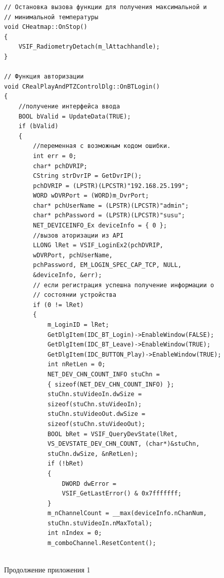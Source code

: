\documentclass[14pt, a4paper]{extreport}
\begin{document}
\begin{Verbatim}[fontseries=c, fontsize=\fontsize{10pt}{12pt}\selectfont]
// Остановка вызова функции для получения максимальной и 
// минимальной температуры
void CHeatmap::OnStop()
{
	VSIF_RadiometryDetach(m_lAttachhandle);
}

// Функция авторизации 
void CRealPlayAndPTZControlDlg::OnBTLogin()
{
	//получение интерфейса ввода
	BOOL bValid = UpdateData(TRUE);	
	if (bValid)
	{
		//переменная с возможным кодом ошибки.
		int err = 0;	
		char* pchDVRIP;
		CString strDvrIP = GetDvrIP();
		pchDVRIP = (LPSTR)(LPCSTR)"192.168.25.199";
		WORD wDVRPort = (WORD)m_DvrPort;
		char* pchUserName = (LPSTR)(LPCSTR)"admin";
		char* pchPassword = (LPSTR)(LPCSTR)"susu";
		NET_DEVICEINFO_Ex deviceInfo = { 0 };
		//вызов аторизации из API 
		LLONG lRet = VSIF_LoginEx2(pchDVRIP, 
		wDVRPort, pchUserName,
		pchPassword, EM_LOGIN_SPEC_CAP_TCP, NULL,
		&deviceInfo, &err);
		// если регистрация успешна получение информации о
		// состоянии устройства
		if (0 != lRet)
		{
			m_LoginID = lRet;
			GetDlgItem(IDC_BT_Login)->EnableWindow(FALSE);
			GetDlgItem(IDC_BT_Leave)->EnableWindow(TRUE);
			GetDlgItem(IDC_BUTTON_Play)->EnableWindow(TRUE);
			int nRetLen = 0;
			NET_DEV_CHN_COUNT_INFO stuChn = 
			{ sizeof(NET_DEV_CHN_COUNT_INFO) };
			stuChn.stuVideoIn.dwSize = 
			sizeof(stuChn.stuVideoIn);
			stuChn.stuVideoOut.dwSize = 
			sizeof(stuChn.stuVideoOut);
			BOOL bRet = VSIF_QueryDevState(lRet, 
			VS_DEVSTATE_DEV_CHN_COUNT, (char*)&stuChn, 
			stuChn.dwSize, &nRetLen);
			if (!bRet)
			{
				DWORD dwError = 
				VSIF_GetLastError() & 0x7fffffff;
			}
			m_nChannelCount = __max(deviceInfo.nChanNum, 
			stuChn.stuVideoIn.nMaxTotal);
			int nIndex = 0;
			m_comboChannel.ResetContent();
			
\end{Verbatim}
\begin{flushright} \noindent Продолжение приложения 1 \end{flushright}
\end{document}
